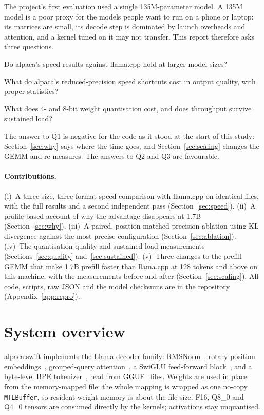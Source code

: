\documentclass[10pt,twocolumn]{article}
\begin{document}
The project's first evaluation used a single 135M-parameter model. A 135M model is a poor proxy for the models people want to run on a phone or laptop: its matrices are small, its decode step is dominated by launch overheads and attention, and a kernel tuned on it may not transfer. This report therefore asks three questions.
\begin{description}\setlength\itemsep{0pt}
\item[Q1] Do alpaca's speed results against llama.cpp hold at larger model sizes?
\item[Q2] What do alpaca's reduced-precision speed shortcuts cost in output quality, with proper statistics?
\item[Q3] What does 4- and 8-bit weight quantisation cost, and does throughput survive sustained load?
\end{description}
The answer to Q1 is negative for the code as it stood at the start of this study: Section~\ref{sec:why} says where the time goes, and Section~\ref{sec:scaling} changes the GEMM and re-measures. The answers to Q2 and Q3 are favourable.

\paragraph{Contributions.} (i)~A three-size, three-format speed comparison with llama.cpp on identical files, with the full results and a second independent pass (Section~\ref{sec:speed}). (ii)~A profile-based account of why the advantage disappears at 1.7B (Section~\ref{sec:why}). (iii)~A paired, position-matched precision ablation using KL divergence against the most precise configuration (Section~\ref{sec:ablation}). (iv)~The quantisation-quality and sustained-load measurements (Sections~\ref{sec:quality} and~\ref{sec:sustained}). (v)~Three changes to the prefill GEMM that make 1.7B prefill faster than llama.cpp at 128 tokens and above on this machine, with the measurements before and after (Section~\ref{sec:scaling}). All code, scripts, raw JSON and the model checksums are in the repository (Appendix~\ref{app:repro}).

\section{System overview}
\label{sec:system}
alpaca.swift implements the Llama decoder family: RMSNorm~\cite{rmsnorm}, rotary position embeddings~\cite{rope}, grouped-query attention~\cite{gqa}, a SwiGLU feed-forward block~\cite{swiglu}, and a byte-level BPE tokenizer~\cite{gpt2}, read from GGUF~\cite{gguf} files. Weights are used in place from the memory-mapped file: the whole mapping is wrapped as one no-copy \texttt{MTLBuffer}, so resident weight memory is about the file size. F16, Q8\_0 and Q4\_0 tensors are consumed directly by the kernels; activations stay unquantised.
\end{document}
